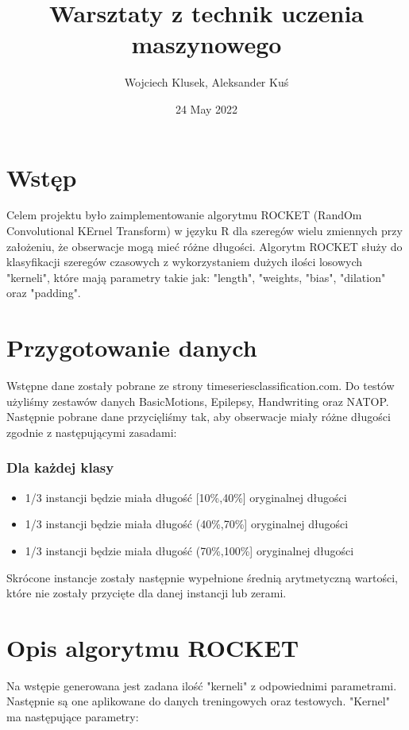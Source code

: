 \documentclass[12pt]{article}
\title{Warsztaty z technik uczenia maszynowego}
\author{Wojciech Klusek, Aleksander Kuś}
\date{24 May 2022}
\begin{document}
\maketitle

\section{Wstęp}
Celem projektu było zaimplementowanie algorytmu ROCKET (RandOm Convolutional KErnel Transform) w języku R dla szeregów wielu zmiennych przy założeniu, że obserwacje mogą mieć różne długości. Algorytm ROCKET służy do klasyfikacji szeregów czasowych z wykorzystaniem dużych ilości losowych "kerneli", które mają parametry takie jak: "length", "weights, "bias", "dilation" oraz "padding".

\section{Przygotowanie danych}
Wstępne dane zostały pobrane ze strony timeseriesclassification.com. Do testów użyliśmy zestawów danych BasicMotions, Epilepsy, Handwriting oraz NATOP. Następnie pobrane dane przycięliśmy tak, aby obserwacje miały różne długości zgodnie z następującymi zasadami: 

\subsubsection*{Dla każdej klasy}
\begin{itemize}
  \item 1/3 instancji będzie miała długość [10\%,40\%] oryginalnej długości
  \item 1/3 instancji będzie miała długość (40\%,70\%] oryginalnej długości
  \item 1/3 instancji będzie miała długość (70\%,100\%] oryginalnej długości
\end{itemize}

Skrócone instancje zostały następnie wypełnione średnią arytmetyczną wartości, które nie zostały przycięte dla danej instancji lub zerami.

\section{Opis algorytmu ROCKET}
Na wstępie generowana jest zadana ilość "kerneli" z odpowiednimi parametrami. Następnie są one aplikowane do danych treningowych oraz testowych. "Kernel" ma następujące parametry:
\end{document}
